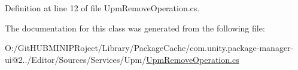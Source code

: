 Definition at line 12 of file Upm\+Remove\+Operation.\+cs.



The documentation for this class was generated from the following file\+:\begin{DoxyCompactItemize}
\item 
O\+:/\+Git\+H\+U\+B\+M\+I\+N\+I\+P\+Roject/\+Library/\+Package\+Cache/com.\+unity.\+package-\/manager-\/ui@2../\+Editor/\+Sources/\+Services/\+Upm/\mbox{\hyperlink{_upm_remove_operation_8cs}{Upm\+Remove\+Operation.\+cs}}\end{DoxyCompactItemize}
